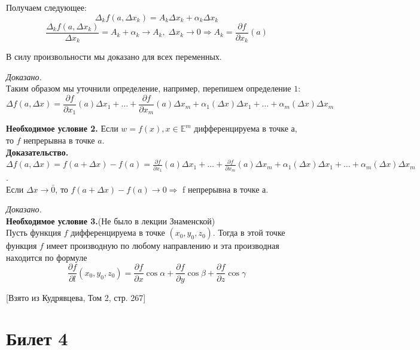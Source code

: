 \documentclass[a4paper,12pt]{article} %
\begin{document}
 Получаем следующее: 
 \[\Delta_k f(a, \Delta x_k) = A_k\Delta x_k + \alpha_k\Delta x_k\]
 \[\frac{\Delta_k f(a, \Delta x_k)}{\Delta x_k} = A_k + \alpha_k \to A_k, \; \Delta x_k \to 0 \Rightarrow A_k = \frac{\partial f}{\partial x_k} (a)\]
 
 В силу произвольности мы доказано для всех переменных.
 
 \textit{Доказано.}\\
 
 Таким образом мы уточнили определение, например, перепишем определение $1$:
 \[\Delta f(a, \Delta x) = \frac{\partial f}{\partial x_1}(a) \Delta x_1 + \ldots + \frac{\partial f}{\partial x_m}(a) \Delta x_m + \alpha_1(\Delta x) \Delta x_1 + \ldots + \alpha_m (\Delta x)\Delta x_m\]
 
 \textbf{Необходимое условие 2.} Если $w = f(x), x \in \mathds{E}^m$ дифференцируема в точке а, то $f$ непрерывна в точке $a$.\\
 
 \textbf{Доказательство.}\\
 $\Delta f(a, \Delta x) = f(a + \Delta x) - f(a) = \frac{\partial f}{\partial x_1}(a) \Delta x_1 + \ldots + \frac{\partial f}{\partial x_m}(a) \Delta x_m + \alpha_1(\Delta x) \Delta x_1 + \ldots + \alpha_m (\Delta x)\Delta x_m$.\\
 Если $\Delta x \to \bar0$, то $f(a + \Delta x) - f(a) \to 0 \Rightarrow $ f непрерывна в точке а.
 
 \textit{Доказано.}\\
 
 \textbf{Необходимое условие 3.}(Не было в лекции Знаменской)\\
 Пусть функция $f$ 	дифференцируема в  точке $(x_0, y_0, z_0)$. Тогда в этой точке функция $f$ имеет производную по любому направлению и эта производная находится по формуле 
 \[\frac{\partial f}{\partial l}(x_0, y_0, z_0) = \frac{\partial f}{\partial x}\cos \alpha + \frac{\partial f}{\partial y}\cos\beta + \frac{\partial f}{\partial z}\cos \gamma\]
 \begin{center}
 		 [Взято из Кудрявцева, Том 2, стр. 267]
 \end{center}


\newpage
\section{Билет 4}
\end{document}
